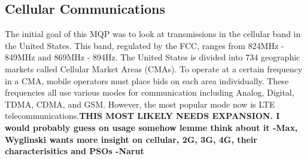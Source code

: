 \subsection{Cellular Communications}
The initial goal of this MQP was to look at transmissions in the cellular band in the United States. This band, regulated by the FCC, ranges from 824MHz - 849MHz and 869MHz - 894Hz\cite{cellular_coms}. The United States is divided into 734 geographic markets called Cellular Market Areas (CMAs). To operate at a certain frequency in a CMA, mobile operators must place bids on each area individually. These frequencies all use various modes for communication including Analog, Digital, TDMA, CDMA, and GSM. However, the most popular mode now is LTE telecommunications\cite{cellular_book}.\textbf{THIS MOST LIKELY NEEDS EXPANSION. I would probably guess on usage somehow lemme think about it -Max, Wyglinski wants more insight on cellular, 2G, 3G, 4G, their characterisitics and PSOs -Narut}

